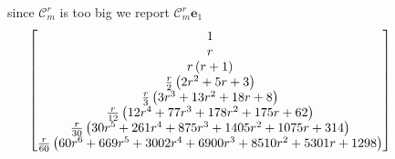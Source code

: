 since $\mathcal{C}_{m}^{r}$ is too big we report $\mathcal{C}_{m}^{r}\textbf{e}_{1}$ 
\begin{displaymath}
\hspace{-1.5cm}
\left[\begin{matrix}1 \\r \\r \left(r + 1\right) \\\frac{r}{2} \left(2 r^{2} + 5 r + 3\right) \\\frac{r}{3} \left(3 r^{3} + 13 r^{2} + 18 r + 8\right) \\\frac{r}{12} \left(12 r^{4} + 77 r^{3} + 178 r^{2} + 175 r + 62\right) \\\frac{r}{30} \left(30 r^{5} + 261 r^{4} + 875 r^{3} + 1405 r^{2} + 1075 r + 314\right) \\\frac{r}{60} \left(60 r^{6} + 669 r^{5} + 3002 r^{4} + 6900 r^{3} + 8510 r^{2} + 5301 r + 1298\right) \end{matrix}\right]
\end{displaymath}
